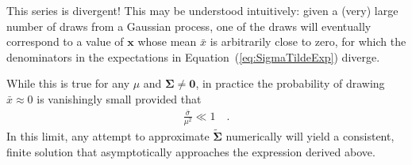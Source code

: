\documentclass[modern]{aastex62}
\begin{document}

This series is divergent!
This may be understood intuitively: given a (very) large number of draws from
a Gaussian process, one of the draws will eventually correspond to a value of
$\mathbf{x}$ whose
mean $\bar{x}$ is arbitrarily close to zero, for which the denominators in the
expectations in Equation~(\ref{eq:SigmaTildeExp}) diverge.

While this is true for any
$\mu$ and $\pmb{\Sigma} \ne \mathbf{0}$, in practice the probability of
drawing $\bar{x} \approx 0$ is vanishingly small provided that
%
\begin{align}
    \frac{\bar{\sigma}}{\mu^2} \ll 1
    \quad.
\end{align}
%
In this limit, any attempt to approximate $\tilde{\pmb{\Sigma}}$
numerically will yield a consistent, finite solution that
asymptotically approaches the expression derived above.

\ifdefined {}

    \clearpage

    \appendix
\end{document}
